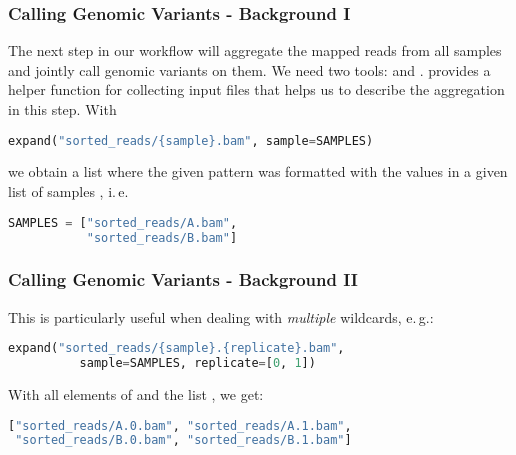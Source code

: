 \begin{frame}[fragile]
 \frametitle{Calling Genomic Variants - Background I}
 The next step in our workflow will aggregate the mapped reads from all samples and jointly call genomic variants on them. We need two tools:  and . \newline \pause
 \Snakemake{} provides a helper function for collecting input files that helps us to describe the aggregation in this step. With
 \begin{lstlisting}[language=Python,style=Python]
expand("sorted_reads/{sample}.bam", sample=SAMPLES)
 \end{lstlisting}
 we obtain a list where the given pattern  was formatted with the values in a given list of samples , i.\,e.
 \begin{lstlisting}[language=Python,style=Python]
SAMPLES = ["sorted_reads/A.bam", 
           "sorted_reads/B.bam"]
 \end{lstlisting}
\end{frame}

\begin{frame}[fragile]
 \frametitle{Calling Genomic Variants - Background II}
 This is particularly useful when dealing with \emph{multiple} wildcards, e.\,g.:
 \begin{lstlisting}[language=Python,style=Python]
expand("sorted_reads/{sample}.{replicate}.bam", 
          sample=SAMPLES, replicate=[0, 1])
 \end{lstlisting}
 With all elements of  and the list \altverb{[0, 1]}, we get:
 \begin{lstlisting}[language=Python,style=Python]
["sorted_reads/A.0.bam", "sorted_reads/A.1.bam", 
 "sorted_reads/B.0.bam", "sorted_reads/B.1.bam"]
 \end{lstlisting}
\end{frame}
  
